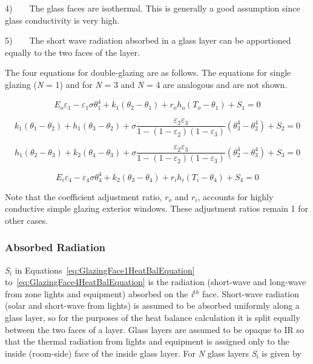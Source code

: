 4)~~~~The glass faces are isothermal. This is generally a good assumption since glass conductivity is very high.

5)~~~~The short wave radiation absorbed in a glass layer can be apportioned equally to the two faces of the layer.

The four equations for double-glazing are as follows. The equations for single glazing (\emph{N} = 1) and for \emph{N} = 3 and \emph{N} = 4 are analogous and are not shown.

\begin{equation}
{E_o}{\varepsilon_1} - {\varepsilon_1}\sigma \theta_1^4 + {k_1}\left( {{\theta_2} - {\theta_1}} \right) + {r_o}{h_o}\left( {{T_o} - {\theta_1}} \right) + {S_1} = 0
\label{eq:GlazingFace1HeatBalEquation}
\end{equation}

\begin{equation}
{k_1}\left( {{\theta_1} - {\theta_2}} \right) + {h_1}\left( {{\theta_3} - {\theta_2}} \right) + \sigma \frac{{{\varepsilon_2}{\varepsilon_3}}}{{1 - \left( {1 - {\varepsilon_2}} \right)\left( {1 - {\varepsilon_3}} \right)}}\left( {\theta_3^4 - \theta_2^4} \right) + {S_2} = 0
\end{equation}

\begin{equation}
{h_1}({\theta_2} - {\theta_3}) + {k_2}({\theta_4} - {\theta_3}) + \sigma \frac{{{\varepsilon_2}{\varepsilon_3}}}{{1 - \left( {1 - {\varepsilon_2}} \right)\left( {1 - {\varepsilon_3}} \right)}}\left( {\theta_2^4 - \theta_3^4} \right) + {S_3} = 0
\end{equation}

\begin{equation}
{E_i}{\varepsilon_4} - {\varepsilon_4}\sigma \theta_4^4 + {k_2}\left( {{\theta_3} - {\theta_4}} \right) + {r_i}{h_i}\left( {{T_i} - {\theta_4}} \right) + {S_4} = 0
\label{eq:GlazingFace4HeatBalEquation}
\end{equation}

Note that the coefficient adjustment ratio, \({r_o}\) and \({r_i}\), accounts for highly conductive simple glazing exterior windows. These adjustment ratios remain 1 for other cases.

\subsubsection{Absorbed Radiation}\label{absorbed-radiation}

\emph{S\(_{i}\)} in Equations~\ref{eq:GlazingFace1HeatBalEquation} to~\ref{eq:GlazingFace4HeatBalEquation} is the radiation (short-wave and long-wave from zone lights and equipment) absorbed on the \emph{i}\(^{th}\) face. Short-wave radiation (solar and short-wave from lights) is assumed to be absorbed uniformly along a glass layer, so for the purposes of the heat balance calculation it is split equally between the two faces of a layer. Glass layers are assumed to be opaque to IR so that the thermal radiation from lights and equipment is assigned only to the inside (room-side) face of the inside glass layer. For \emph{N} glass layers \emph{S\(_{i}\)} is given by

